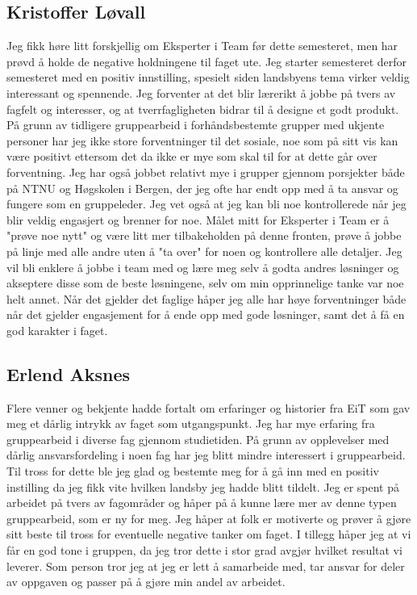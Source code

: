 \subsection{Kristoffer Løvall}
Jeg fikk høre litt forskjellig om Eksperter i Team før dette semesteret, men har prøvd å holde de negative holdningene til faget ute. Jeg starter semesteret derfor semesteret med en positiv innstilling, spesielt siden landsbyens tema virker veldig interessant og spennende. Jeg forventer at det blir lærerikt å jobbe på tvers av fagfelt og interesser, og at tverrfagligheten bidrar til å designe et godt produkt. På grunn av tidligere gruppearbeid i forhåndsbestemte grupper med ukjente personer har jeg ikke store forventninger til det sosiale, noe som på sitt vis kan være positivt ettersom det da ikke er mye som skal til for at dette går over forventning. Jeg har også jobbet relativt mye i grupper gjennom porsjekter både på NTNU og Høgskolen i Bergen, der jeg ofte har endt opp med å ta ansvar og fungere som en gruppeleder. Jeg vet også at jeg kan bli noe kontrollerede når jeg blir veldig engasjert og brenner for noe.  Målet mitt for Eksperter i Team er å "prøve noe nytt" og være litt mer tilbakeholden på denne fronten, prøve å jobbe på linje med alle andre uten å "ta over" for noen og kontrollere alle detaljer. Jeg vil bli enklere å jobbe i team med og lære meg selv å godta andres løsninger og akseptere disse som de beste løsningene, selv om min opprinnelige tanke var noe helt annet. Når det gjelder det faglige håper jeg alle har høye forventninger både når det gjelder engasjement for å ende opp med gode løsninger, samt det å få en god karakter i faget.

\subsection{Erlend Aksnes} Flere venner og bekjente hadde fortalt om erfaringer og historier fra EiT som gav meg et dårlig intrykk av faget som utgangspunkt. 
Jeg har mye erfaring fra gruppearbeid i diverse fag gjennom studietiden.
 På grunn av opplevelser med dårlig ansvarsfordeling i noen fag har jeg blitt mindre interessert i gruppearbeid. 
Til tross for dette ble jeg glad og bestemte meg for å gå inn med en positiv instilling da jeg fikk vite hvilken landsby jeg hadde blitt tildelt. 
Jeg er spent på arbeidet på tvers av fagområder og håper på å kunne lære mer av denne typen gruppearbeid, som er ny for meg.  
Jeg håper at folk er motiverte og prøver å gjøre sitt beste til tross for eventuelle negative tanker om faget. 
I tillegg håper jeg at vi får en god tone i gruppen, da jeg tror dette i stor grad avgjør hvilket resultat vi leverer. 
Som person tror jeg at jeg er lett å samarbeide med, tar ansvar for deler av oppgaven og passer på å gjøre min andel av arbeidet. 

